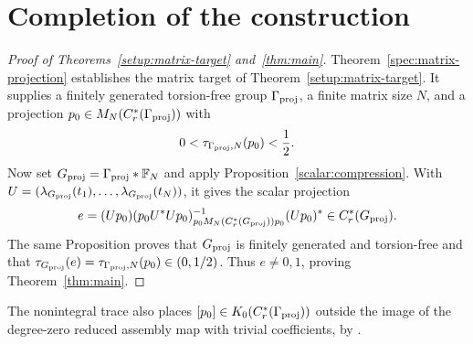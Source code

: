 \section{Completion of the construction}
\label{sec:conclusion}

\begin{proof}[Proof of Theorems~\ref{setup:matrix-target}
and~\ref{thm:main}]
Theorem~\ref{spec:matrix-projection} establishes the matrix target of
Theorem~\ref{setup:matrix-target}. It supplies a
finitely generated torsion-free group \(\Gamma_{\mathrm{proj}}\), a finite matrix
size \(N\), and a projection \(p_0\in M_N(C_r^*(\Gamma_{\mathrm{proj}}))\) with
\[
 0<\tau_{\Gamma_{\mathrm{proj}},N}(p_0)<\frac12.
\]
Now set \(G_{\mathrm{proj}}=\Gamma_{\mathrm{proj}}*\mathbb F_N\) and apply
Proposition~\ref{scalar:compression}. With
\(U=(\lambda_{G_{\mathrm{proj}}}(t_1),\ldots,\lambda_{G_{\mathrm{proj}}}(t_N))\), it gives the
scalar projection
\[
 e=(Up_0)
 (p_0U^*Up_0)^{-1}_{p_0M_N(C_r^*(G_{\mathrm{proj}}))p_0}
 (Up_0)^*
 \in C_r^*(G_{\mathrm{proj}}).
\]
The same Proposition proves that \(G_{\mathrm{proj}}\) is finitely generated
and torsion-free and that
\(\tau_{G_{\mathrm{proj}}}(e)=\tau_{\Gamma_{\mathrm{proj}},N}(p_0)\in(0,1/2)\).
Thus \(e\ne0,1\), proving Theorem~\ref{thm:main}.
\end{proof}

The nonintegral trace also places
\([p_0]\in K_0(C_r^*(\Gamma_{\mathrm{proj}}))\) outside the image of the degree-zero
reduced assembly map with trivial coefficients, by
\cite[Proposition~10.3]{BGW2016}.
